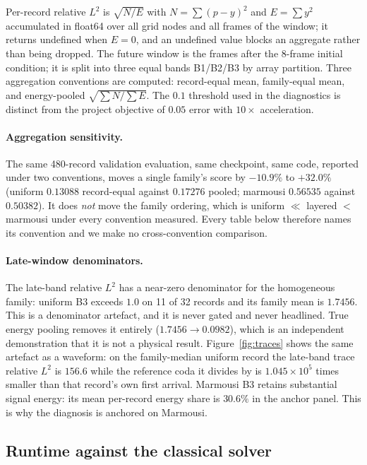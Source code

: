 \documentclass[11pt,a4paper]{article}
\begin{document}
Per-record relative $L^2$ is $\sqrt{N/E}$ with $N=\sum(p-y)^2$ and $E=\sum y^2$ accumulated
in float64 over all grid nodes and all frames of the window; it returns undefined when $E=0$,
and an undefined value blocks an aggregate rather than being dropped. The future window is
the frames after the 8-frame initial condition; it is split into three equal bands B1/B2/B3
by array partition. Three aggregation conventions are computed: record-equal mean, family-equal
mean, and energy-pooled $\sqrt{\sum N / \sum E}$. The $0.1$ threshold used in the diagnostics
is distinct from the project objective of $0.05$ error with $10\times$ acceleration.

\paragraph{Aggregation sensitivity.}
The same 480-record validation evaluation, same checkpoint, same code, reported under two
conventions, moves a single family's score by $-10.9\%$ to $+32.0\%$ (uniform $0.13088$
record-equal against $0.17276$ pooled; marmousi $0.56535$ against $0.50382$). It does
\emph{not} move the family ordering, which is uniform $\ll$ layered $<$ marmousi under every
convention measured. Every table below therefore names its convention and we make no cross-convention
comparison.

\paragraph{Late-window denominators.}
The late-band relative $L^2$ has a near-zero denominator for the homogeneous family: uniform
B3 exceeds $1.0$ on 11 of 32 records and its family mean is $1.7456$. This is a denominator
artefact, and it is never gated and never headlined. True energy pooling removes it entirely
($1.7456 \to 0.0982$), which is an independent demonstration that it is not a physical result.
Figure~\ref{fig:traces} shows the same artefact as a waveform: on the family-median uniform
record the late-band trace relative $L^2$ is $156.6$ while the reference coda it divides by is
$1.045\times10^{5}$ times smaller than that record's own first arrival.
Marmousi B3 retains substantial signal energy: its mean per-record energy share is $30.6\%$ in the anchor panel.
This is why the diagnosis is anchored on Marmousi.

\subsection{Runtime against the classical solver}
\label{sec:runtime}
\end{document}
